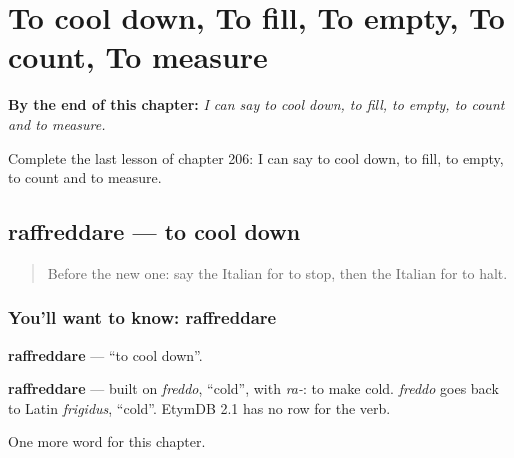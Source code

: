 
\chapter{To cool down, To fill, To empty, To count, To measure}
\label{ch:it-to-cool-down-to-fill-to-empty-to-count-to-measure}

\begin{chapteropening}
\textbf{By the end of this chapter:} \emph{I can say to cool down, to fill, to empty, to count and to measure.}

Complete the last lesson of chapter 206: I can say to cool down, to fill, to empty, to count and to measure.
\end{chapteropening}

\section[raffreddare]{raffreddare — to cool down}

\label{lesson:IT-C206-raffreddare}



\begin{quote}
Before the new one: say the Italian for to stop, then the Italian for to halt.
\end{quote}

\subsection*{You'll want to know: raffreddare}
\textbf{raffreddare} — \textquotedblleft{}to cool down\textquotedblright{}.

\begin{cousinweb}
\textbf{raffreddare} — built on \emph{freddo}, \textquotedblleft{}cold\textquotedblright{}, with \emph{ra-}: to make cold. \emph{freddo} goes back to Latin \emph{frigidus}, \textquotedblleft{}cold\textquotedblright{}. EtymDB 2.1 has no row for the verb.
\end{cousinweb}

\begin{grammarlens}[title={What you've built}]
One more word for this chapter.
\end{grammarlens}

